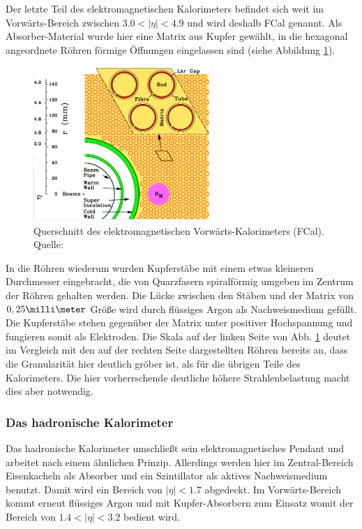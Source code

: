 Der letzte Teil des elektromagnetischen Kalorimeters befindet sich weit im
Vorwärts-Bereich zwischen $3.0<|\eta|<4.9$ und wird deshalb \acf{FCal} genannt.
Als Absorber-Material wurde hier eine Matrix aus Kupfer gewählt, in die
hexagonal angeordnete Röhren förmige Öffnungen eingelassen sind (siehe
Abbildung \ref{fig:fcal}).
\begin{figure}[h]
    \centering
    \includegraphics[width=0.6\textwidth]{img/fcal}
    \caption[Querschnitt des elektromagnetischen Vorwärts-Kalorimeters (FCal)]
        {Querschnitt des elektromagnetischen Vorwärts-Kalorimeters (FCal).
        Quelle: \cite{ATLAS:1996ab}}
    \label{fig:fcal}
\end{figure}
In die Röhren wiederum wurden Kupferstäbe mit einem etwas kleineren Durchmesser
eingebracht, die von Quarzfasern spiralförmig umgeben im Zentrum der Röhren
gehalten werden. Die Lücke zwischen den Stäben und der Matrix von
$0,25\milli\meter$ Größe wird durch flüssiges Argon als Nachweismedium
gefüllt. Die Kupferstäbe stehen gegenüber der Matrix unter positiver
Hochspannung und fungieren somit als Elektroden. Die Skala auf der linken Seite
von Abb. \ref{fig:fcal} deutet im Vergleich mit den auf der rechten Seite
dargestellten Röhren bereits an, dass die Granularität hier deutlich gröber
ist, als für die übrigen Teile des Kalorimeters. Die hier vorherrschende
deutliche höhere Strahlenbelastung macht dies aber notwendig.

\subsubsection{Das hadronische Kalorimeter}
Das hadronische Kalorimeter umschließt sein elektromagnetisches Pendant und
arbeitet nach einem ähnlichen Prinzip. Allerdings werden hier im
Zentral-Bereich Eisenkacheln als Absorber und ein Szintillator als aktives
Nachweismedium benutzt. Damit wird ein Bereich von $|\eta|<1.7$ abgedeckt.
Im Vorwärts-Bereich kommt erneut flüssiges Argon und mit Kupfer-Absorbern zum
Einsatz womit der Bereich von $1.4<|\eta|<3.2$ bedient wird.



